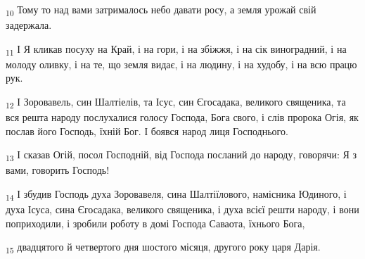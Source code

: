 \begin{tcolorbox}
\textsubscript{10} Тому то над вами затрималось небо давати росу, а земля урожай свій задержала.
\end{tcolorbox}
\begin{tcolorbox}
\textsubscript{11} І Я кликав посуху на Край, і на гори, і на збіжжя, і на сік виноградний, і на молоду оливку, і на те, що земля видає, і на людину, і на худобу, і на всю працю рук.
\end{tcolorbox}
\begin{tcolorbox}
\textsubscript{12} І Зоровавель, син Шалтіелів, та Ісус, син Єгосадака, великого священика, та вся решта народу послухалися голосу Господа, Бога свого, і слів пророка Огія, як послав його Господь, їхній Бог. І боявся народ лиця Господнього.
\end{tcolorbox}
\begin{tcolorbox}
\textsubscript{13} І сказав Огій, посол Господній, від Господа посланий до народу, говорячи: Я з вами, говорить Господь!
\end{tcolorbox}
\begin{tcolorbox}
\textsubscript{14} І збудив Господь духа Зоровавеля, сина Шалтіїлового, намісника Юдиного, і духа Ісуса, сина Єгосадака, великого священика, і духа всієї решти народу, і вони поприходили, і зробили роботу в домі Господа Саваота, їхнього Бога,
\end{tcolorbox}
\begin{tcolorbox}
\textsubscript{15} двадцятого й четвертого дня шостого місяця, другого року царя Дарія.
\end{tcolorbox}
